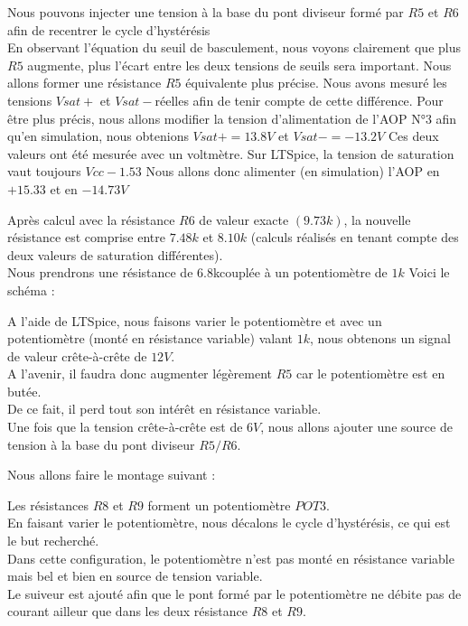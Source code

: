 Nous pouvons injecter une tension à la base du pont diviseur formé par $R5$ et $R6$ afin de recentrer le cycle d’hystérésis\\

En observant l’équation du seuil de basculement, nous voyons clairement que plus $R5$ augmente, plus l'écart entre les deux tensions de seuils sera important.
Nous allons former une résistance $R5$ équivalente plus précise.
Nous avons mesuré les tensions $Vsat+$ et $Vsat-$réelles afin de tenir compte de cette différence. 
Pour être plus précis, nous allons modifier la tension d’alimentation de l’AOP N°3 afin qu’en simulation, nous obtenions $Vsat+=13.8V$ et $Vsat-=-13.2V$
Ces deux valeurs ont été mesurée avec un voltmètre.
Sur LTSpice, la tension de saturation vaut toujours $Vcc-1.53$
Nous allons donc alimenter (en simulation) l’AOP en $+15.33$ et en $-14.73V$

Après calcul avec la résistance $R6$ de valeur exacte $(9.73k)$, la nouvelle résistance est  comprise entre $7.48k$ et $8.10k$ 
(calculs réalisés en tenant compte des deux valeurs de saturation différentes). \\

Nous prendrons une résistance de 6.8kcouplée à un potentiomètre de $1k$
Voici le schéma :

A l’aide de LTSpice, nous faisons varier le potentiomètre et avec un potentiomètre (monté en résistance variable) valant $1k$, nous obtenons un signal 
de valeur crête-à-crête de $12V$.\\


A l’avenir, il faudra donc augmenter légèrement $R5$ car le potentiomètre est en butée.\\
 De ce fait, il perd tout son intérêt en résistance variable.\\

Une fois que la tension crête-à-crête est de $6V$, nous allons ajouter une source de tension à la base du pont diviseur $R5/R6$.




Nous allons faire le montage suivant : 



Les résistances $R8$ et $R9$ forment un potentiomètre $POT3$. \\
En faisant varier le potentiomètre, nous décalons le cycle d'hystérésis, ce qui est le but recherché. \\

Dans cette configuration, le potentiomètre n’est pas monté en résistance variable mais bel et bien en source de tension variable.\\
Le suiveur est ajouté afin que le pont formé par le potentiomètre ne débite pas de courant ailleur que dans les deux résistance $R8$ et $R9$.

